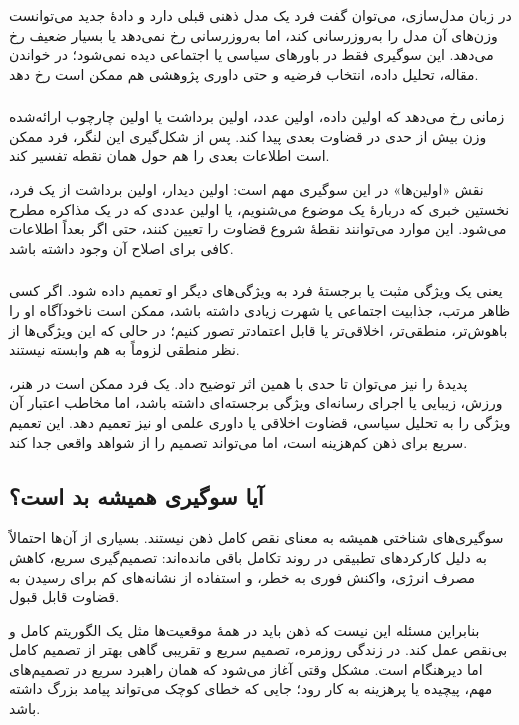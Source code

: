 در زبان مدل‌سازی، می‌توان گفت فرد یک مدل ذهنی قبلی دارد و دادهٔ جدید می‌توانست وزن‌های آن مدل را به‌روزرسانی کند، اما به‌روزرسانی رخ نمی‌دهد یا بسیار ضعیف رخ می‌دهد. این سوگیری فقط در باورهای سیاسی یا اجتماعی دیده نمی‌شود؛ در خواندن مقاله، تحلیل داده، انتخاب فرضیه و حتی داوری پژوهشی هم ممکن است رخ دهد.

\subsubsection{}
 زمانی رخ می‌دهد که اولین داده، اولین عدد، اولین برداشت یا اولین چارچوب ارائه‌شده وزن بیش از حدی در قضاوت بعدی پیدا کند. پس از شکل‌گیری این لنگر، فرد ممکن است اطلاعات بعدی را هم حول همان نقطه تفسیر کند.

نقش «اولین‌ها» در این سوگیری مهم است: اولین دیدار، اولین برداشت از یک فرد، نخستین خبری که دربارهٔ یک موضوع می‌شنویم، یا اولین عددی که در یک مذاکره مطرح می‌شود. این موارد می‌توانند نقطهٔ شروع قضاوت را تعیین کنند، حتی اگر بعداً اطلاعات کافی برای اصلاح آن وجود داشته باشد.

\subsubsection{}
 یعنی یک ویژگی مثبت یا برجستهٔ فرد به ویژگی‌های دیگر او تعمیم داده شود. اگر کسی ظاهر مرتب، جذابیت اجتماعی یا شهرت زیادی داشته باشد، ممکن است ناخودآگاه او را باهوش‌تر، منطقی‌تر، اخلاقی‌تر یا قابل اعتمادتر تصور کنیم؛ در حالی که این ویژگی‌ها از نظر منطقی لزوماً به هم وابسته نیستند.

پدیدهٔ  را نیز می‌توان تا حدی با همین اثر توضیح داد. یک فرد ممکن است در هنر، ورزش، زیبایی یا اجرای رسانه‌ای ویژگی برجسته‌ای داشته باشد، اما مخاطب اعتبار آن ویژگی را به تحلیل سیاسی، قضاوت اخلاقی یا داوری علمی او نیز تعمیم دهد. این تعمیم سریع برای ذهن کم‌هزینه است، اما می‌تواند تصمیم را از شواهد واقعی جدا کند.

\subsection{آیا سوگیری همیشه بد است؟}
سوگیری‌های شناختی همیشه به معنای نقص کامل ذهن نیستند. بسیاری از آن‌ها احتمالاً به دلیل کارکردهای تطبیقی در روند تکامل باقی مانده‌اند: تصمیم‌گیری سریع، کاهش مصرف انرژی، واکنش فوری به خطر، و استفاده از نشانه‌های کم برای رسیدن به قضاوت قابل قبول.

بنابراین مسئله این نیست که ذهن باید در همهٔ موقعیت‌ها مثل یک الگوریتم کامل و بی‌نقص عمل کند. در زندگی روزمره، تصمیم سریع و تقریبی گاهی بهتر از تصمیم کامل اما دیرهنگام است. مشکل وقتی آغاز می‌شود که همان راهبرد سریع در تصمیم‌های مهم، پیچیده یا پرهزینه به کار رود؛ جایی که خطای کوچک می‌تواند پیامد بزرگ داشته باشد.

